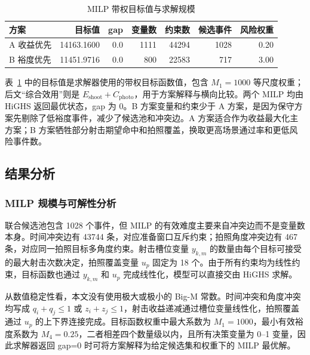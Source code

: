 \documentclass{cumcmthesis}
\begin{document}
\begin{table}[H]
  \centering
  \caption{MILP 带权目标值与求解规模}
  \label{tab:solver}
  \small
  \begin{tabular}{lrrrrrr}
    \toprule
    方案 & 目标值 & gap & 变量数 & 约束数 & 候选事件 & 风险权重\\
    \midrule
    A 收益优先 & 14163.1600 & 0.0 & 1111 & 44294 & 1028 & 0.20\\
    B 裕度优先 & 11451.9716 & 0.0 & 800 & 22583 & 717 & 3.00\\
    \bottomrule
  \end{tabular}
\end{table}
表~\ref{tab:solver} 中的目标值是求解器使用的带权目标函数值，包含 $M_1=1000$ 等尺度权重；后文“综合效用”则是 $E_{\mathrm{shoot}}+C_{\mathrm{photo}}$，用于方案解释与横向比较。两个 MILP 均由 HiGHS 返回最优状态，gap 为 0。B 方案变量和约束少于 A 方案，是因为保守方案先剔除了低裕度事件，减少了候选池和冲突边。A 方案适合作为收益最大化主方案；B 方案牺牲部分射击期望命中和拍照覆盖，换取更高场景通过率和更低风险事件数。

\subsection{结果分析}
\subsubsection{MILP 规模与可解性分析}
联合候选池包含 1028 个事件，但 MILP 的有效难度主要来自冲突边而不是变量数本身。时间冲突边有 43744 条，对应准备窗口互斥约束；拍照角度冲突边有 467 条，对应同一拍照目标多角度约束。射击槽位变量 $y_{k,m}$ 的数量由每个目标可接受的最大射击次数决定，拍照覆盖变量 $u_p$ 固定为 18 个。由于所有约束均为线性约束，目标函数也通过 $y_{k,m}$ 和 $u_p$ 完成线性化，模型可以直接交由 HiGHS 求解。

从数值稳定性看，本文没有使用极大或极小的 Big-M 常数。时间冲突和角度冲突均写成 $q_i+q_j\le1$ 或 $z_i+z_j\le1$，射击收益递减通过槽位变量线性化，拍照覆盖通过 $u_p$ 的上下界连接完成。目标函数权重中最大系数为 $M_1=1000$，最小有效裕度系数为 $M_4=0.25$，二者相差四个数量级以内，且所有决策变量为 0--1 变量，因此求解器返回 gap=0 时可将方案解释为给定候选集和权重下的 MILP 最优解。
\end{document}
